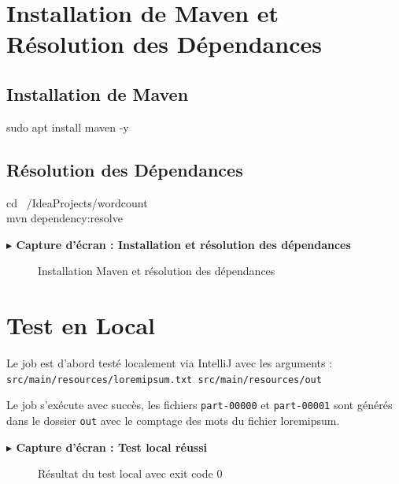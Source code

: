 \documentclass[12pt,a4paper]{report}
\newcommand{\etape}[1]{\vspace{6pt}\textbf{\color{bleuESP}$\blacktriangleright$ #1}\vspace{4pt}}
\begin{document}
\section{Installation de Maven et Résolution des Dépendances}

\subsection{Installation de Maven}

\begin{cmdbox}
sudo apt install maven -y
\end{cmdbox}

\subsection{Résolution des Dépendances}

\begin{cmdbox}
cd ~/IdeaProjects/wordcount \\
mvn dependency:resolve
\end{cmdbox}

\etape{Capture d'écran : Installation et résolution des dépendances}
\begin{figure}[H]
  \centering
  \caption{Installation Maven et résolution des dépendances}
\end{figure}

\section{Test en Local}

Le job est d'abord testé localement via IntelliJ avec les arguments :
\texttt{src/main/resources/loremipsum.txt src/main/resources/out}

\begin{successbox}
Le job s'exécute avec succès, les fichiers \texttt{part-00000} et \texttt{part-00001} sont générés dans le dossier \texttt{out} avec le comptage des mots du fichier loremipsum.
\end{successbox}

\etape{Capture d'écran : Test local réussi}
\begin{figure}[H]
  \centering
  \caption{Résultat du test local avec exit code 0}
\end{figure}
\end{document}
